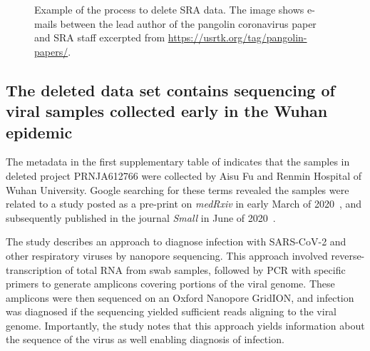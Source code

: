 \documentclass[9pt,twocolumn,twoside]{gsajnl_modified}
\begin{document}
\begin{figure}[]
\centering
{}
\caption{Example of the process to delete SRA data.
The image shows e-mails between the lead author of the pangolin coronavirus paper~\citet{xiao2020isolation} and SRA staff excerpted from \url{https://usrtk.org/tag/pangolin-papers/}.
}
\label{fig:pangolin_emails}
\end{figure}

\subsection{The deleted data set contains sequencing of viral samples collected early in the Wuhan epidemic}
The metadata in the first supplementary table of \citet{farkas2020insights} indicates that the samples in deleted project PRNJA612766 were collected by Aisu Fu and Renmin Hospital of Wuhan University.
Google searching for these terms revealed the samples were related to a study posted as a pre-print on \textit{medRxiv} in early March of 2020~\citep{wang2020medRxiv}, and subsequently published in the journal \textit{Small} in June of 2020~\citep{wang2020small}.

The study describes an approach to diagnose infection with SARS-CoV-2 and other respiratory viruses by nanopore sequencing.
This approach involved reverse-transcription of total RNA from swab samples, followed by PCR with specific primers to generate amplicons covering portions of the viral genome.
These amplicons were then sequenced on an Oxford Nanopore GridION, and infection was diagnosed if the sequencing yielded sufficient reads aligning to the viral genome.
Importantly, the study notes that this approach yields information about the sequence of the virus as well enabling diagnosis of infection.
\end{document}
